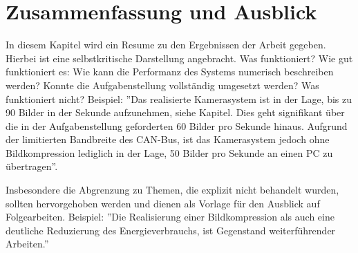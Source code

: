 \chapter{Zusammenfassung und Ausblick}

In diesem Kapitel wird ein Resume zu den Ergebnissen der Arbeit gegeben.
Hierbei ist eine selbstkritische Darstellung angebracht. Was funktioniert? Wie gut funktioniert es: Wie kann die Performanz des Systems numerisch beschreiben werden? Konnte die Aufgabenstellung vollständig umgesetzt werden? Was funktioniert nicht? 
Beispiel: ''Das realisierte Kamerasystem ist in der Lage, bis zu 90 Bilder in der Sekunde aufzunehmen, siehe Kapitel. Dies geht signifikant über die in der Aufgabenstellung geforderten 60 Bilder pro Sekunde hinaus. Aufgrund der limitierten Bandbreite des CAN-Bus, ist das Kamerasystem jedoch ohne Bildkompression lediglich in der Lage, 50 Bilder pro Sekunde an einen PC zu übertragen''.

Insbesondere die Abgrenzung zu Themen, die explizit nicht behandelt wurden, sollten hervorgehoben werden und dienen als Vorlage für den Ausblick auf Folgearbeiten. Beispiel: ''Die Realisierung einer Bildkompression als auch eine deutliche Reduzierung des Energieverbrauchs, ist Gegenstand weiterführender Arbeiten.''
